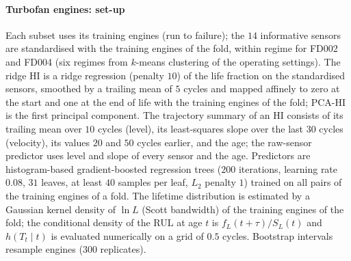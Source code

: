 \documentclass[preprint,12pt]{elsarticle}
\theoremstyle{definition}
\begin{document}
\paragraph{Turbofan engines: set-up} Each subset uses its training engines (run to failure); the $14$ informative sensors are standardised with the training engines of the fold, within regime for FD002 and FD004 (six regimes from $k$-means clustering of the operating settings). The ridge HI is a ridge regression (penalty $10$) of the life fraction on the standardised sensors, smoothed by a trailing mean of $5$ cycles and mapped affinely to zero at the start and one at the end of life with the training engines of the fold; PCA-HI is the first principal component. The trajectory summary of an HI consists of its trailing mean over $10$ cycles (level), its least-squares slope over the last $30$ cycles (velocity), its values $20$ and $50$ cycles earlier, and the age; the raw-sensor predictor uses level and slope of every sensor and the age. Predictors are histogram-based gradient-boosted regression trees ($200$ iterations, learning rate $0.08$, $31$ leaves, at least $40$ samples per leaf, $L_2$ penalty $1$) trained on all pairs of the training engines of a fold. The lifetime distribution is estimated by a Gaussian kernel density of $\ln L$ (Scott bandwidth) of the training engines of the fold; the conditional density of the RUL at age $t$ is $f_L(t+\tau)/S_L(t)$ and $h(T_t\mid t)$ is evaluated numerically on a grid of $0.5$ cycles. Bootstrap intervals resample engines ($300$ replicates).
\end{document}
